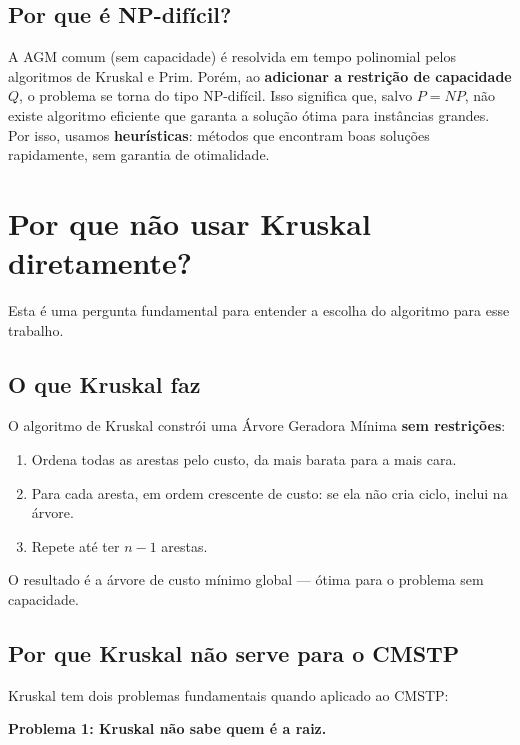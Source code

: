 \documentclass[12pt, a4paper]{article}
\begin{document}
\subsection{Por que é NP-difícil?}

A AGM comum (sem capacidade) é resolvida em tempo polinomial pelos algoritmos de Kruskal e Prim. Porém, ao \textbf{adicionar a restrição de capacidade} $Q$, o problema se torna do tipo NP-difícil. Isso significa que, salvo $P = NP$, não existe algoritmo eficiente que garanta a solução ótima para instâncias grandes. Por isso, usamos \textbf{heurísticas}: métodos que encontram boas soluções rapidamente, sem garantia de otimalidade.

\section{Por que não usar Kruskal diretamente?}

Esta é uma pergunta fundamental para entender a escolha do algoritmo para esse trabalho.

\subsection{O que Kruskal faz}

O algoritmo de Kruskal constrói uma Árvore Geradora Mínima \textbf{sem restrições}:

\begin{enumerate}
    \item Ordena todas as arestas pelo custo, da mais barata para a mais cara.
    \item Para cada aresta, em ordem crescente de custo: se ela não cria ciclo, inclui na árvore.
    \item Repete até ter $n-1$ arestas.
\end{enumerate}

O resultado é a árvore de custo mínimo global --- ótima para o problema sem capacidade.

\subsection{Por que Kruskal não serve para o CMSTP}

Kruskal tem dois problemas fundamentais quando aplicado ao CMSTP:

\medskip

\textbf{Problema 1: Kruskal não sabe quem é a raiz.}
\end{document}
